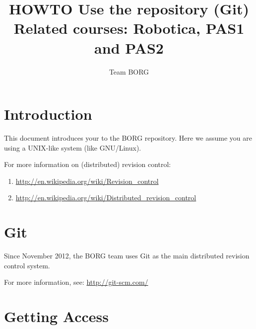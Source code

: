 \documentclass[a4paper, 10pt]{article}
\title{HOWTO Use the repository (Git) \\ \small{Related courses: Robotica, PAS1 and PAS2}}
\author{Team BORG}
\begin{document}
\maketitle

\section{Introduction}

This document introduces your to the BORG repository.
Here we assume you are using a UNIX-like system (like GNU/Linux).

For more information on (distributed) revision control:
\begin{enumerate}
    \item \url{http://en.wikipedia.org/wiki/Revision\_control}
    \item \url{http://en.wikipedia.org/wiki/Distributed\_revision\_control}
\end{enumerate}

\section{Git}

Since November 2012, the BORG team uses Git as the main distributed revision control system.

For more information, see:
\url{http://git-scm.com/}

\section{Getting Access}
\end{document}
